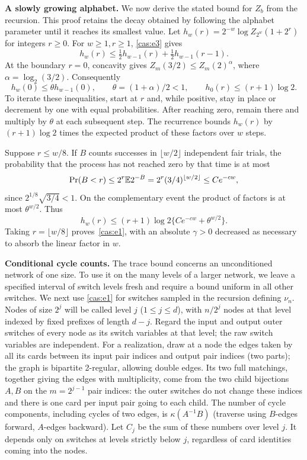 \medskip\noindent\textbf{A slowly growing alphabet.}\enspace
We now derive the stated bound for $Z_b$ from the recursion.  This proof
retains the decay obtained by following the alphabet parameter until it
reaches its smallest value.
Let \(h_w(r)=2^{-w}\log Z_{2^w}(1+2^r)\) for integers \(r\ge 0\). For \(w\ge 1,r\ge 1\), \eqref{cas:e3} gives
\[
h_w(r)\le \tfrac12 h_{w-1}(r)+\tfrac12 h_{w-1}(r-1).
\]
At the boundary $r=0$, concavity gives
$Z_m(3/2)\le Z_m(2)^\alpha$, where $\alpha=\log_2(3/2)$.
Consequently
\[
 h_w(0)\le\theta h_{w-1}(0),\qquad
 \theta=(1+\alpha)/2<1,
 \qquad h_0(r)\le(r+1)\log2.
\]
To iterate these inequalities, start at $r$ and, while positive, stay
in place or decrement by one with equal probabilities. After reaching
zero, remain there and multiply by $\theta$ at each subsequent step.
The recurrence bounds $h_w(r)$ by $(r+1)\log2$ times the expected
product of these factors over $w$ steps.

Suppose $r\le w/8$. If $B$ counts successes in $\lfloor w/2\rfloor$
independent fair trials, the probability that the process has not
reached zero by that time is at most
\[
 \Pr(B<r)\le 2^r\mathbb E 2^{-B}
 =2^r(3/4)^{\lfloor w/2\rfloor}\le Ce^{-cw},
\]
since $2^{1/8}\sqrt{3/4}<1$. On the complementary event the product
of factors is at most $\theta^{w/2}$. Thus
\[
 h_w(r)\le(r+1)\log2\{Ce^{-cw}+\theta^{w/2}\}.
\]
Taking $r=\lfloor w/8\rfloor$ proves~\eqref{cas:e1}, with an absolute
$\gamma>0$ decreased as necessary to absorb the linear factor in $w$.

\medskip\noindent\textbf{Conditional cycle counts.}\enspace
The trace bound concerns an unconditioned network of one size.  To use it
on the many levels of a larger network, we leave a specified interval of
switch levels fresh and require a bound uniform in all other switches.
We next use \eqref{cas:e1} for switches sampled in the recursion defining \(\nu_n\). Nodes of size \(2^j\) will be called level \(j\) (\(1\le j\le d\)), with \(n/2^j\) nodes at that level indexed by fixed prefixes of length \(d-j\). Regard the input and output outer switches of every node as its switch variables at that level; the raw switch variables are independent. For a realization, draw at a node the edges taken by all its cards between its input pair indices and output pair indices (two parts); the graph is bipartite 2-regular, allowing double edges. Its two full matchings, together giving the edges with multiplicity, come from the two child bijections \(A,B\) on the \(m=2^{j-1}\) pair indices: the outer switches do not change these indices and there is one card per input pair going to each child. The number of cycle components, including cycles of two edges, is \(\kappa(A^{-1}B)\) (traverse using \(B\)-edges forward, \(A\)-edges backward). Let \(C_j\) be the sum of these numbers over level \(j\). It depends only on switches at levels strictly below \(j\), regardless of card identities coming into the nodes.

